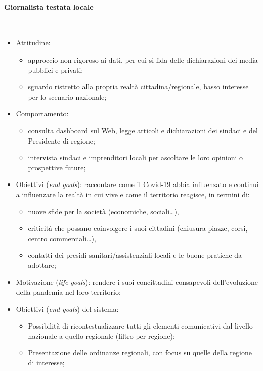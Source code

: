 \paragraph{Giornalista testata locale}\mbox{}\\
\begin{itemize}
    \item Attitudine:
    \begin{itemize}
        \item approccio non rigoroso ai dati, per cui si fida delle dichiarazioni dei media pubblici e privati;
        \item sguardo ristretto alla propria realtà cittadina/regionale, basso interesse per lo scenario nazionale;
    \end{itemize}
	\item Comportamento: 
	\begin{itemize}
	    \item consulta dashboard sul Web, legge articoli e dichiarazioni dei sindaci e del Presidente di regione;
	    \item intervista sindaci e imprenditori locali per ascoltare le loro opinioni o prospettive future;
    \end{itemize}
	\item Obiettivi (\textit{end goals}): raccontare come il Covid-19 abbia influenzato e continui a influenzare la realtà in cui vive e come il territorio reagisce, in termini di:
	\begin{itemize}
        \item nuove sfide per la società (economiche, sociali…),
        \item criticità che possano coinvolgere i suoi cittadini (chiusura piazze, corsi, centro commerciali…),
        \item contatti dei presidi sanitari/assistenziali locali e le buone pratiche da adottare;
    \end{itemize}
	\item Motivazione (\textit{life goals}): rendere i suoi concittadini consapevoli dell'evoluzione della pandemia nel loro territorio;
	\item Obiettivi (\textit{end goals}) del sistema:
    \begin{itemize}
        \item Possibilità di ricontestualizzare tutti gli elementi comunicativi dal livello nazionale a quello regionale (filtro per regione);
        \item Presentazione delle ordinanze regionali, con focus su quelle della regione di interesse;
    \end{itemize}
\end{itemize}

